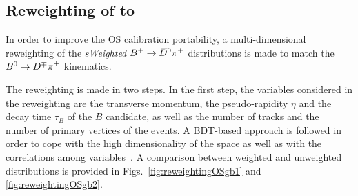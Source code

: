 \subsection[Reweighting of $\Bp\to\Dzb\pip$ to $\Bz\to\Dmp\pipm$]{Reweighting of \boldmath{$\Bp\to\Dzb\pip$} to \boldmath{$\Bz\to\Dmp\pipm$}}
\label{app:ReweightingOSTagging}

In order to improve the OS calibration portability, a multi-dimensional reweighting of the \emph{sWeighted} $\Bp\to\Dzb\pip$ distributions
is made to match the $\Bz\to\Dmp\pipm$ kinematics.

The reweighting is made in two steps. In the first step, the variables considered in the reweighting are 
the transverse momentum, the pseudo-rapidity $\eta$ and the decay time $\tau_{B}$ of the $B$ candidate, as well as the
number of tracks and the number of primary vertices of the events. A BDT-based approach is followed in order to cope with 
the high dimensionality of the space as well as with the correlations among variables~\cite{hepml}. A comparison between 
weighted and unweighted distributions is provided in Figs.~\ref{fig:reweightingOSgb1} and \ref{fig:reweightingOSgb2}. 

